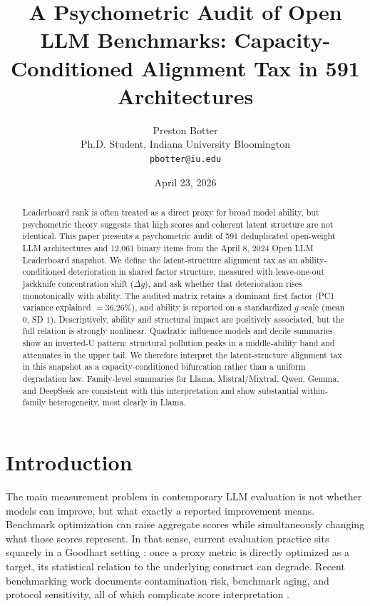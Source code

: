 \documentclass[11pt]{article}
\title{\textbf{A Psychometric Audit of Open LLM Benchmarks: Capacity-Conditioned Alignment Tax in 591 Architectures}}
\author{Preston Botter\\Ph.D. Student, Indiana University Bloomington\\\texttt{pbotter@iu.edu}}
\date{April 23, 2026}
\begin{document}
\maketitle

\begin{abstract}
Leaderboard rank is often treated as a direct proxy for broad model ability, but psychometric theory suggests that high scores and coherent latent structure are not identical. This paper presents a psychometric audit of 591 deduplicated open-weight LLM architectures and 12,061 binary items from the April 8, 2024 Open LLM Leaderboard snapshot. We define the latent-structure alignment tax as an ability-conditioned deterioration in shared factor structure, measured with leave-one-out jackknife concentration shift ($\Delta g$), and ask whether that deterioration rises monotonically with ability. The audited matrix retains a dominant first factor (PC1 variance explained $=36.26\%$), and ability is reported on a standardized $g$ scale (mean 0, SD 1). Descriptively, ability and structural impact are positively associated, but the full relation is strongly nonlinear. Quadratic influence models and decile summaries show an inverted-U pattern: structural pollution peaks in a middle-ability band and attenuates in the upper tail. We therefore interpret the latent-structure alignment tax in this snapshot as a capacity-conditioned bifurcation rather than a uniform degradation law. Family-level summaries for Llama, Mistral/Mixtral, Qwen, Gemma, and DeepSeek are consistent with this interpretation and show substantial within-family heterogeneity, most clearly in Llama.
\end{abstract}

\section{Introduction}
The main measurement problem in contemporary LLM evaluation is not whether models can improve, but what exactly a reported improvement means. Benchmark optimization can raise aggregate scores while simultaneously changing what those scores represent. In that sense, current evaluation practice sits squarely in a Goodhart setting \citep{goodhart1975problems, strathern1997improving}: once a proxy metric is directly optimized as a target, its statistical relation to the underlying construct can degrade. Recent benchmarking work documents contamination risk, benchmark aging, and protocol sensitivity, all of which complicate score interpretation \citep{liang2023helm, kiela2021dynabench, wu2025antileakbench, chen2025emnlpcontam, alzahrani2024targets}.
\end{document}
